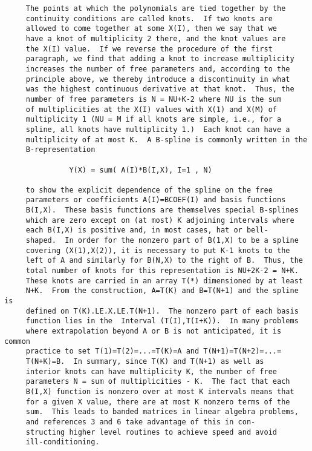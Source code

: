 \begin{verbatim}
     The points at which the polynomials are tied together by the
     continuity conditions are called knots.  If two knots are
     allowed to come together at some X(I), then we say that we
     have a knot of multiplicity 2 there, and the knot values are
     the X(I) value.  If we reverse the procedure of the first
     paragraph, we find that adding a knot to increase multiplicity
     increases the number of free parameters and, according to the
     principle above, we thereby introduce a discontinuity in what
     was the highest continuous derivative at that knot.  Thus, the
     number of free parameters is N = NU+K-2 where NU is the sum
     of multiplicities at the X(I) values with X(1) and X(M) of
     multiplicity 1 (NU = M if all knots are simple, i.e., for a
     spline, all knots have multiplicity 1.)  Each knot can have a
     multiplicity of at most K.  A B-spline is commonly written in the
     B-representation

               Y(X) = sum( A(I)*B(I,X), I=1 , N)

     to show the explicit dependence of the spline on the free
     parameters or coefficients A(I)=BCOEF(I) and basis functions
     B(I,X).  These basis functions are themselves special B-splines
     which are zero except on (at most) K adjoining intervals where
     each B(I,X) is positive and, in most cases, hat or bell-
     shaped.  In order for the nonzero part of B(1,X) to be a spline
     covering (X(1),X(2)), it is necessary to put K-1 knots to the
     left of A and similarly for B(N,X) to the right of B.  Thus, the
     total number of knots for this representation is NU+2K-2 = N+K.
     These knots are carried in an array T(*) dimensioned by at least
     N+K.  From the construction, A=T(K) and B=T(N+1) and the spline is
     defined on T(K).LE.X.LE.T(N+1).  The nonzero part of each basis
     function lies in the  Interval (T(I),T(I+K)).  In many problems
     where extrapolation beyond A or B is not anticipated, it is common
     practice to set T(1)=T(2)=...=T(K)=A and T(N+1)=T(N+2)=...=
     T(N+K)=B.  In summary, since T(K) and T(N+1) as well as
     interior knots can have multiplicity K, the number of free
     parameters N = sum of multiplicities - K.  The fact that each
     B(I,X) function is nonzero over at most K intervals means that
     for a given X value, there are at most K nonzero terms of the
     sum.  This leads to banded matrices in linear algebra problems,
     and references 3 and 6 take advantage of this in con-
     structing higher level routines to achieve speed and avoid
     ill-conditioning.


\end{verbatim}

